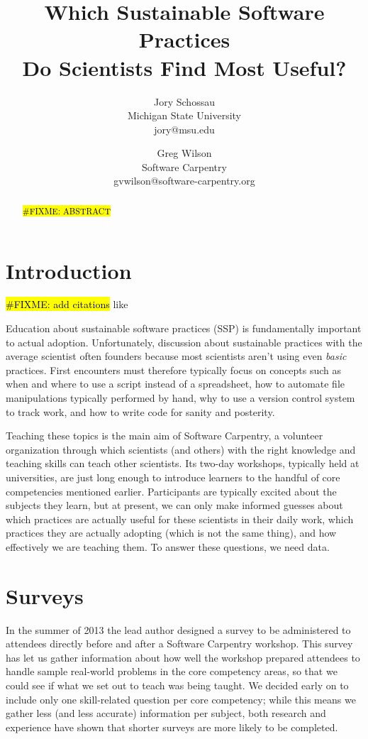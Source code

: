 \documentclass[10pt,twocolumn,submission,copyright,creativecommons]{article}
\title{Which Sustainable Software Practices\\ Do Scientists Find Most Useful?}
\author{
    Jory Schossau \\
    \small{Michigan State University} \\
    \small{jory@msu.edu}
    \and
    Greg Wilson \\
    \small{Software Carpentry} \\
    \small{gvwilson@software-carpentry.org}
}
\newcommand{\fixme}[1]{\hl{\#FIXME: #1}}
\begin{document}
\maketitle

\begin{abstract}
\fixme{ABSTRACT}
\end{abstract}

\section{Introduction}

\fixme{add citations} like \cite{b:hannay2009}

Education about sustainable software practices (SSP)
is fundamentally important to actual adoption.
Unfortunately,
discussion about sustainable practices with the average scientist often founders
because most scientists aren't using even \emph{basic} practices.
First encounters must therefore typically focus on concepts such as
when and where to use a script instead of a spreadsheet,
how to automate file manipulations typically performed by hand,
why to use a version control system to track work,
and how to write code for sanity and posterity.

Teaching these topics is the main aim of Software Carpentry,
a volunteer organization through which scientists (and others)
with the right knowledge and teaching skills can teach other scientists.
Its two-day workshops,
typically held at universities,
are just long enough to introduce learners to the handful of core competencies mentioned earlier.
Participants are typically excited about the subjects they learn,
but at present,
we can only make informed guesses about
which practices are actually useful for these scientists in their daily work,
which practices they are actually adopting (which is not the same thing),
and how effectively we are teaching them.
To answer these questions,
we need data.

\section{Surveys}

In the summer of 2013
the lead author designed a survey
to be administered to attendees directly before and after a Software Carpentry workshop.
This survey has let us gather information about
how well the workshop prepared attendees to handle sample real-world problems in the core competency areas,
so that we could see if what we set out to teach was being taught.
We decided early on to include only one skill-related question per core competency;
while this means we gather less (and less accurate) information per subject,
both research and experience have shown that shorter surveys are more likely to be completed.
\end{document}
